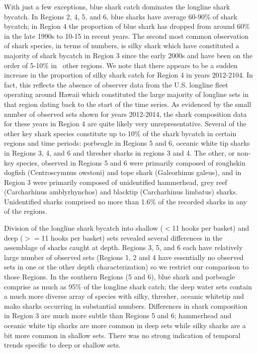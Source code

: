 \documentclass[12pt]{SCreport}
\begin{document}
With just a few exceptions, blue shark catch dominates the longline shark bycatch.  In Regions 2, 4, 5, and 6, blue sharks have average 60-90\% of shark bycatch; in Region 4 the proportion of blue shark has dropped from around 60\% in the late 1990s to 10-15 in recent years.  The second most common observation of shark species, in terms of numbers, is silky shark which have constituted a majority of shark bycatch in Region 3 since the early 2000s and have been on the order of 5-10\% in \ other regions.  We note that there appears to be a sudden increase in the proportion of silky shark catch for Region 4 in years 2012-2104.  In fact, this reflects the absence of observer data from the U.S. longline fleet operating around Hawaii which constituted the large majority of longline sets in that region dating back to the start of the time series.  As evidenced by the small number of observed sets shown for years 2012-2014, the shark composition data for these years in Region 4 are quite likely very unrepresentative.  Several of the other key shark species constitute up to 10\% of the shark bycatch in certain regions and time periods: porbeagle in Regions 5 and 6, oceanic white tip sharks in Regions 3, 4, and 6 and thresher sharks in regions 3 and 4.  The other, or non-key species, observed in Regions 5 and 6 were primarily composed of roughskin dogfish (Centroscymnus owstoni) and tope shark (Galeorhinus galeus), and in Region 3 were primarily composed of unidentified hammerhead, grey reef (Carcharhinus amblyrhynchos) and blacktip (Carcharhinus limbatus) sharks. Unidentified sharks comprised no more than 1.6\% of the recorded sharks in any of the regions.

Division of the longline shark bycatch into shallow ($<$11 hooks per basket) and deep ($>=$11 hooks per basket) sets revealed several differences in the assemblage of sharks caught at depth.  Regions 3, 5, and 6 each have relatively large number of observed sets (Regions 1, 2 and 4 have essentially no observed sets in one or the other depth characterization) so we restrict our comparison to those Regions.  In the southern Regions (5 and 6), blue shark and porbeagle comprise as much as 95\% of the longline shark catch; the deep water sets contain a much more diverse array of species with silky, thresher, oceanic whitetip and mako sharks occurring in substantial numbers.  Differences in shark composition in Region 3 are much more subtle than Regions 5 and 6; hammerhead and oceanic white tip sharks are more common in deep sets while silky sharks are a bit more common in shallow sets. There was no strong indication of temporal trends specific to deep or shallow sets.
\end{document}

